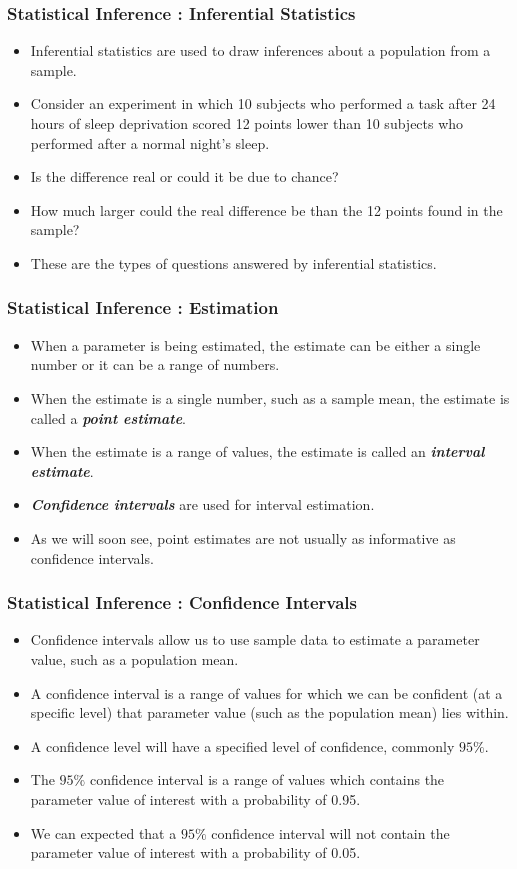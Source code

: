 \documentclass[a4]{beamer}
\begin{document}
\begin{frame}
\frametitle{Statistical Inference : Inferential Statistics}
\begin{itemize}
\item Inferential statistics are used to draw inferences about a population from a sample.
\item Consider an experiment in which 10 subjects who performed a task after 24 hours of sleep
deprivation scored 12 points lower than 10 subjects who performed after a normal night's sleep.
\item Is the difference real or could it be due to chance?
\item How much larger could the real difference be than the 12 points found in the sample?
\item These are the types of questions answered by inferential statistics.
\end{itemize}
\end{frame}


\begin{frame}
\frametitle{Statistical Inference : Estimation}
\begin{itemize}
\item When a parameter is being estimated, the estimate can be either a single number or it can be a range of numbers.
\item When the estimate is a single number, such as a sample mean, the estimate is called a \textbf{\emph{point estimate}}.
\item When the estimate is a range of values, the estimate is called an \textbf{\emph{interval estimate}}.
\item \textbf{\emph{Confidence intervals}} are used for interval estimation.
\item As we will soon see, point estimates are not usually as informative as confidence intervals.
\end{itemize}
\end{frame}


\begin{frame}
\frametitle{Statistical Inference : Confidence Intervals}
\begin{itemize}
\item Confidence intervals allow us to use sample data to estimate a parameter value, such as a population mean.
\item A confidence interval is a range of values for which we can be confident (at a specific level) that parameter value (such as the population mean)  lies within.
\item A confidence level will have a specified level of confidence, commonly $95\%$.
\item The $95\%$ confidence interval is a range of values which contains the parameter value of interest with a probability of 0.95.
\item We can expected that a $95\%$ confidence interval will not contain the parameter value of interest with a probability of 0.05.
\end{itemize}
\end{frame}
\end{document}
